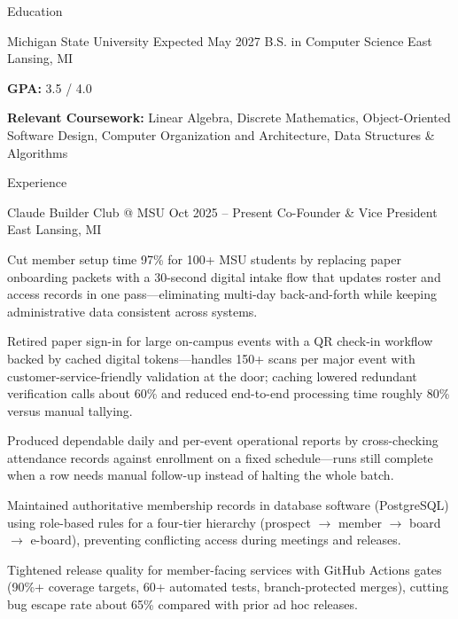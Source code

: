 \documentclass[
	11pt
]{../../../resume}
\begin{document}
	\begin{rSection}{E}{ducation}
		\begin{rSectionEntry}
			{Michigan State University}
			{Expected May 2027}
			{B.S. in Computer Science}
			{}
			{East Lansing, MI}

			\item \textbf{GPA:} 3.5 / 4.0
			\item \textbf{Relevant Coursework:} Linear Algebra, Discrete Mathematics, Object-Oriented Software Design, Computer Organization and Architecture, Data Structures \& Algorithms
		\end{rSectionEntry}
	\end{rSection}

	\begin{rSection}{E}{xperience}
		\begin{rSectionEntry}
			{Claude Builder Club @ MSU}
			{Oct 2025 -- Present}
			{Co-Founder \& Vice President}
			{}
			{East Lansing, MI}

			\item Cut member setup time 97\% for 100+ MSU students by replacing paper onboarding packets with a 30-second digital intake flow that updates roster and access records in one pass—eliminating multi-day back-and-forth while keeping administrative data consistent across systems.
			\item Retired paper sign-in for large on-campus events with a QR check-in workflow backed by cached digital tokens—handles 150+ scans per major event with customer-service-friendly validation at the door; caching lowered redundant verification calls about 60\% and reduced end-to-end processing time roughly 80\% versus manual tallying.
			\item Produced dependable daily and per-event operational reports by cross-checking attendance records against enrollment on a fixed schedule—runs still complete when a row needs manual follow-up instead of halting the whole batch.
			\item Maintained authoritative membership records in database software (PostgreSQL) using role-based rules for a four-tier hierarchy (prospect $\rightarrow$ member $\rightarrow$ board $\rightarrow$ e-board), preventing conflicting access during meetings and releases.
			\item Tightened release quality for member-facing services with GitHub Actions gates (90\%+ coverage targets, 60+ automated tests, branch-protected merges), cutting bug escape rate about 65\% compared with prior ad hoc releases.
		\end{rSectionEntry}


\end{rSection}
\end{document}
